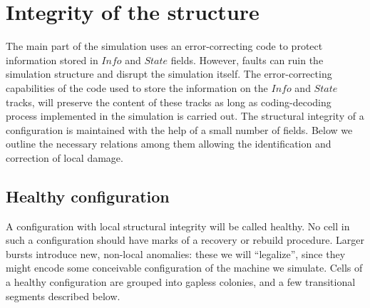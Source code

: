 \documentclass[12pt]{memoir}
\newcommand{\fld}[1]{\ensuremath{\textit{#1}}}
\newcommand{\Z}{Z}
\newcommand{\Info}{\fld{Info}}
\newcommand{\State}{\fld{State}}
\begin{document}



\section{Integrity of the structure}            \label{sec:integrity}

The main part of the simulation uses an error-correcting
code to protect information stored in \( \Info \) and \( \State \) fields.
However, faults can ruin the simulation structure and disrupt the simulation itself.
The error-correcting capabilities of the code 
used to store the information on the \( \Info \) and
\( \State \) tracks, will preserve the content of these tracks as long as coding-decoding
process implemented in the simulation is carried out.
The structural integrity of a configuration is maintained with the help of a small number
of fields.
Below we outline the necessary relations among them 
allowing the identification and correction of local damage.

\subsection{Healthy configuration}

A configuration with local structural integrity will be called healthy.
No cell in such a configuration should have marks of a recovery or
rebuild procedure.
Larger bursts introduce new, non-local anomalies: 
these we will ``legalize'', since they might encode
some conceivable configuration of the machine we simulate.
Cells of a healthy configuration are grouped into gapless colonies, and 
a few transitional segments described below.
\end{document}

